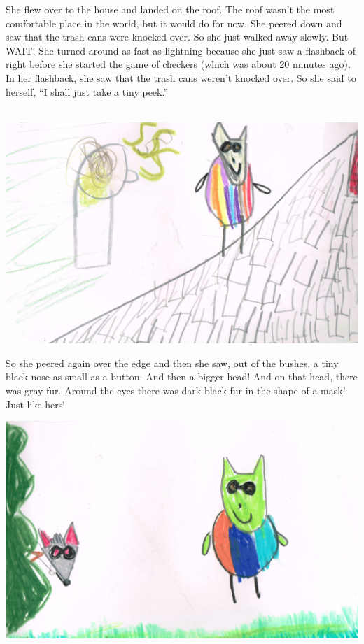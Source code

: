 \documentclass[12pt]{extbook}
\begin{document}
  She flew over to the house and landed on the roof. The roof wasn't the
  most comfortable place in the world, but it would do for now. She peered
  down and saw that the trash cans were knocked over. So she just walked
  away slowly. But WAIT! She turned around as fast as lightning because
  she just saw a flashback of right before she started the game of
  checkers (which was about 20 minutes ago). In her flashback, she saw
  that the trash cans weren't knocked over. So she said to herself,
  \enquote{I shall just take a tiny peek.}
  \vfill

\pagebreak

\begin{center}
  $\ $\vfill
  \includegraphics[width=\textwidth]{img/cm-pic05.png}
  \vfill
\end{center}

\pagebreak
  
  So she peered again over the edge and then she saw, out of the bushes, a
  tiny black nose as small as a button. And then a bigger head! And on
  that head, there was gray fur. Around the eyes there was dark black fur
  in the shape of a mask! Just like hers!
  
\begin{center}
  \includegraphics[width=\textwidth]{img/cm-pic06.png}
\end{center}
\end{document}

